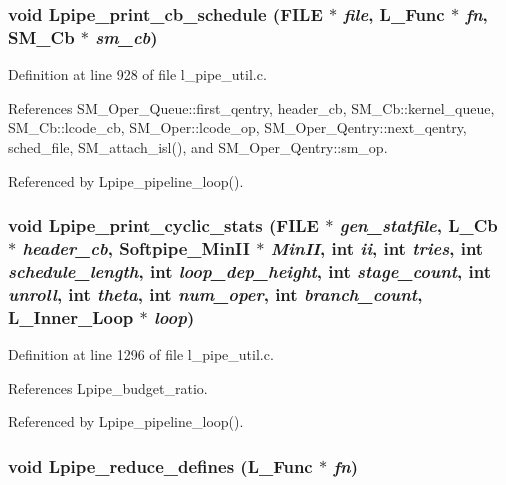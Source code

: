 \subsubsection{\setlength{\rightskip}{0pt plus 5cm}void Lpipe\_\-print\_\-cb\_\-schedule (FILE $\ast$ {\em file}, L\_\-Func $\ast$ {\em fn}, \bf{SM\_\-Cb} $\ast$ {\em sm\_\-cb})}\label{l__pipe__util_8c_b586f12896d4906e0e7015d4ea36b61e}




Definition at line 928 of file l\_\-pipe\_\-util.c.

References SM\_\-Oper\_\-Queue::first\_\-qentry, header\_\-cb, SM\_\-Cb::kernel\_\-queue, SM\_\-Cb::lcode\_\-cb, SM\_\-Oper::lcode\_\-op, SM\_\-Oper\_\-Qentry::next\_\-qentry, sched\_\-file, SM\_\-attach\_\-isl(), and SM\_\-Oper\_\-Qentry::sm\_\-op.

Referenced by Lpipe\_\-pipeline\_\-loop().
\subsubsection{\setlength{\rightskip}{0pt plus 5cm}void Lpipe\_\-print\_\-cyclic\_\-stats (FILE $\ast$ {\em gen\_\-statfile}, L\_\-Cb $\ast$ {\em header\_\-cb}, Softpipe\_\-Min\-II $\ast$ {\em Min\-II}, int {\em ii}, int {\em tries}, int {\em schedule\_\-length}, int {\em loop\_\-dep\_\-height}, int {\em stage\_\-count}, int {\em unroll}, int {\em theta}, int {\em num\_\-oper}, int {\em branch\_\-count}, L\_\-Inner\_\-Loop $\ast$ {\em loop})}\label{l__pipe__util_8c_1717d05a7fa2b065c482d5476745d580}




Definition at line 1296 of file l\_\-pipe\_\-util.c.

References Lpipe\_\-budget\_\-ratio.

Referenced by Lpipe\_\-pipeline\_\-loop().
\subsubsection{\setlength{\rightskip}{0pt plus 5cm}void Lpipe\_\-reduce\_\-defines (L\_\-Func $\ast$ {\em fn})}\label{l__pipe__util_8c_08dd82ece7672006298b40e75a866e6b}




